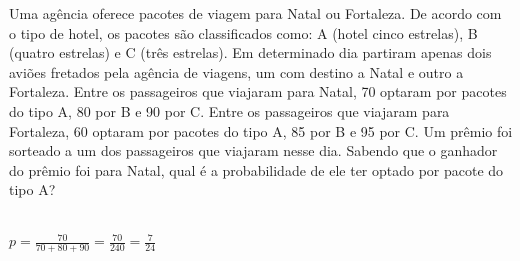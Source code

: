 \begin{ex}
Uma agência oferece pacotes de viagem para Natal ou Fortaleza. De acordo com o tipo de hotel, os pacotes são classificados como: A (hotel cinco estrelas), B (quatro estrelas) e C (três estrelas). Em determinado dia partiram apenas dois aviões fretados pela agência de viagens, um com destino a Natal e outro a Fortaleza. Entre os passageiros que viajaram para Natal, 70 optaram por pacotes do tipo A, 80 por B e 90 por C. Entre os passageiros que viajaram para Fortaleza, 60 optaram por pacotes do tipo A, 85 por B e 95 por C. Um prêmio foi sorteado a um dos passageiros que viajaram nesse dia. Sabendo que o ganhador do prêmio foi para Natal, qual é a probabilidade de ele ter optado por pacote do tipo A? 
  \begin{sol}
   \phantom{A}\\
   $p=\frac{70}{70+80+90}=\frac{70}{240}=\frac{7}{24}$
  \end{sol}
\end{ex}